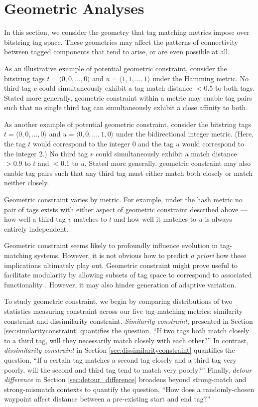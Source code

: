 \section{Geometric Analyses} \label{sec:geometric}

In this section, we consider the geometry that tag matching metrics impose over bitstring tag space.
These geometries may affect the patterns of connectivity between tagged components that tend to arise, or are even possible at all.

As an illustrative example of potential geometric constraint, consider the bitstring tags $t = \langle 0, 0, \ldots, 0 \rangle$ and $u = \langle 1, 1, \ldots, 1 \rangle$ under the Hamming metric.
No third tag $v$ could simultaneously exhibit a tag match distance $<0.5$ to both tags.
Stated more generally, geometric constraint within a metric may enable tag pairs such that no single third tag can simultaneously exhibit a close affinity to both.

As another example of potential geometric constraint, consider the bitstring tags $t = \langle 0, 0, \ldots, 0 \rangle$ and $u = \langle 0, 0, \ldots, 1 , 0 \rangle$ under the bidirectional integer metric.
(Here, the tag $t$ would correspond to the integer 0 and the tag $u$ would correspond to the integer 2.)
No third tag $v$ could simultaneously exhibit a match distance $>0.9$ to $t$ and $<0.1$ to $u$.
Stated more generally, geometric constraint may also enable tag pairs such that any third tag must either match both closely or match neither closely.

Geometric constraint varies by metric.
For example, under the hash metric no pair of tags exists with either aspect of geometric constraint described above --- how well a third tag $v$ matches to $t$ and how well it matches to $u$ is always entirely independent.

Geometric constraint seems likely to profoundly influence evolution in tag-matching systems.
However, it is not obvious how to predict \textit{a priori} how these implications ultimately play out.
Geometric constraint might prove useful to facilitate modularity by allowing subsets of tag space to correspond to associated functionality \citep{holland1990concerning}.
However, it may also hinder generation of adaptive variation.

To study geometric constraint, we begin by comparing distributions of two statistics measuring constraint across our five tag-matching metrics: similarity constraint and dissimilarity constraint.
\textit{Similarity constraint}, presented in Section \ref{sec:similarityconstraint} quantifies the question, ``If two tags both match closely to a third tag, will they necessarily match closely with each other?''
In contrast, \textit{dissimilarity constraint} in Section \ref{sec:dissimilarityconstraint} quantifies the question, ``If a certain tag matches a second tag closely and a third tag very poorly, will the second and third tag tend to match very poorly?''
Finally, \textit{detour difference} in Section \ref{sec:detour_difference} broadens beyond strong-match and strong-mismatch contexts to quantify the question, ``How does a randomly-chosen waypoint affect distance between a pre-existing start and end tag?''

